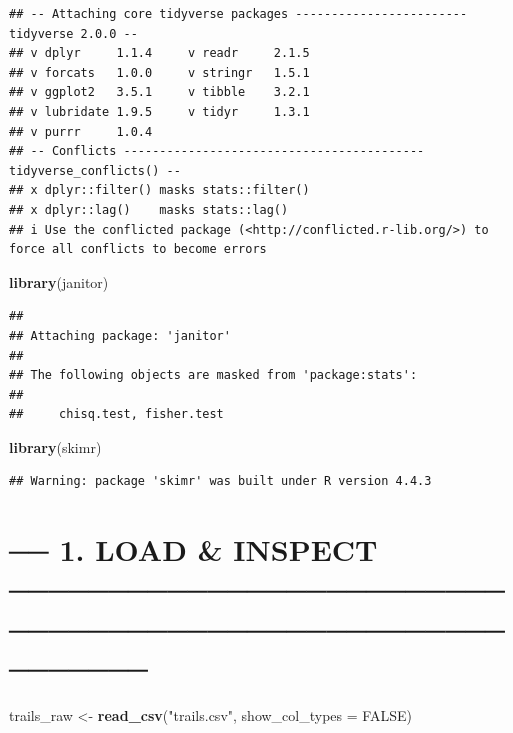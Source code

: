 \documentclass[
]{article}
\newenvironment{Shaded}{\begin{snugshade}}{\end{snugshade}}
\newcommand{\AttributeTok}[1]{\textcolor[rgb]{0.13,0.29,0.53}{#1}}
\newcommand{\ConstantTok}[1]{\textcolor[rgb]{0.56,0.35,0.01}{#1}}
\newcommand{\FunctionTok}[1]{\textcolor[rgb]{0.13,0.29,0.53}{\textbf{#1}}}
\newcommand{\NormalTok}[1]{#1}
\newcommand{\OtherTok}[1]{\textcolor[rgb]{0.56,0.35,0.01}{#1}}
\newcommand{\StringTok}[1]{\textcolor[rgb]{0.31,0.60,0.02}{#1}}
\begin{document}
\begin{verbatim}
## -- Attaching core tidyverse packages ------------------------ tidyverse 2.0.0 --
## v dplyr     1.1.4     v readr     2.1.5
## v forcats   1.0.0     v stringr   1.5.1
## v ggplot2   3.5.1     v tibble    3.2.1
## v lubridate 1.9.5     v tidyr     1.3.1
## v purrr     1.0.4     
## -- Conflicts ------------------------------------------ tidyverse_conflicts() --
## x dplyr::filter() masks stats::filter()
## x dplyr::lag()    masks stats::lag()
## i Use the conflicted package (<http://conflicted.r-lib.org/>) to force all conflicts to become errors
\end{verbatim}

\begin{Shaded}
\begin{Highlighting}[]
\FunctionTok{library}\NormalTok{(janitor)    }
\end{Highlighting}
\end{Shaded}

\begin{verbatim}
## 
## Attaching package: 'janitor'
## 
## The following objects are masked from 'package:stats':
## 
##     chisq.test, fisher.test
\end{verbatim}

\begin{Shaded}
\begin{Highlighting}[]
\FunctionTok{library}\NormalTok{(skimr)       }
\end{Highlighting}
\end{Shaded}

\begin{verbatim}
## Warning: package 'skimr' was built under R version 4.4.3
\end{verbatim}

\section{── 1. LOAD \& INSPECT
─────────────────────────────────────────────────────────}\label{load-inspect}

\begin{Shaded}
\begin{Highlighting}[]
\NormalTok{trails\_raw }\OtherTok{\textless{}{-}} \FunctionTok{read\_csv}\NormalTok{(}\StringTok{"trails.csv"}\NormalTok{, }\AttributeTok{show\_col\_types =} \ConstantTok{FALSE}\NormalTok{)}
\end{Highlighting}
\end{Shaded}
\end{document}
